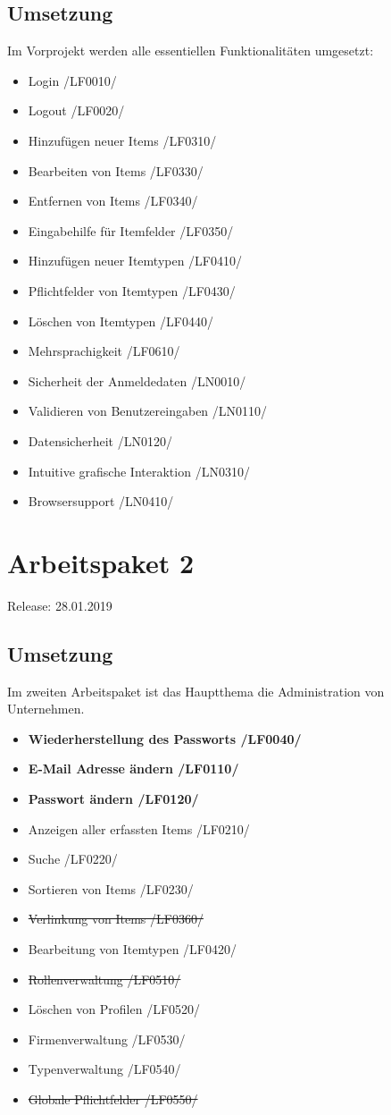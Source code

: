 \documentclass[11pt,a4paper]{report}
\begin{document}
\subsection{Umsetzung}
Im Vorprojekt werden alle essentiellen Funktionalitäten umgesetzt:
\begin{itemize}
\item Login /LF0010/
\item Logout /LF0020/
\item Hinzufügen neuer Items /LF0310/
\item Bearbeiten von Items /LF0330/
\item Entfernen von Items /LF0340/
\item Eingabehilfe für Itemfelder /LF0350/
\item Hinzufügen neuer Itemtypen /LF0410/
\item Pflichtfelder von Itemtypen /LF0430/
\item Löschen von Itemtypen /LF0440/
\item Mehrsprachigkeit /LF0610/
\item Sicherheit der Anmeldedaten /LN0010/
\item Validieren von Benutzereingaben /LN0110/
\item Datensicherheit /LN0120/
\item Intuitive grafische Interaktion /LN0310/
\item Browsersupport /LN0410/
\end{itemize}

\newpage

\section{Arbeitspaket 2}
Release: 28.01.2019
\subsection{Umsetzung}
Im zweiten Arbeitspaket ist das Hauptthema die Administration von Unternehmen.
\begin{itemize}
\item \textbf{Wiederherstellung des Passworts /LF0040/}
\item \textbf{E-Mail Adresse ändern /LF0110/}
\item \textbf{Passwort ändern /LF0120/}
\item Anzeigen aller erfassten Items /LF0210/
\item Suche /LF0220/
\item Sortieren von Items /LF0230/
\item \sout{Verlinkung von Items /LF0360/}
\item Bearbeitung von Itemtypen /LF0420/
\item \sout{Rollenverwaltung /LF0510/}
\item Löschen von Profilen /LF0520/
\item Firmenverwaltung /LF0530/
\item Typenverwaltung /LF0540/
\item \sout{Globale Pflichtfelder /LF0550/}
\end{itemize}
\end{document}
